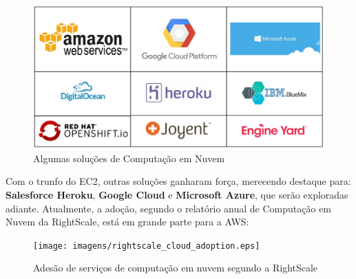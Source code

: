 \begin{figure}[h!]
  \centering
  \includegraphics[scale=0.40]{imagens/clouds.eps}
  \caption{Algumas soluções de Computação em Nuvem\cite{clouds}}
\end{figure}

Com o trunfo do EC2, outras soluções ganharam força, merecendo destaque para: \textbf{Salesforce Heroku}, \textbf{Google Cloud} e \textbf{Microsoft Azure}, que serão exploradas adiante. Atualmente, a adoção, segundo o relatório anual de Computação em Nuvem da RightScale\cite{rightscale}, está em grande parte para a AWS:

\begin{figure}[h!]
  \centering
  \texttt{[image: imagens/rightscale\_cloud\_adoption.eps]}
  \caption{Adesão de serviços de computação em nuvem segundo a RightScale\cite{rightscale}}
\end{figure}
